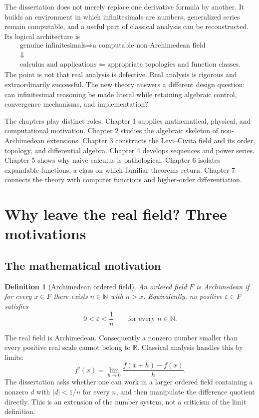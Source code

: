 \documentclass[11pt,a4paper]{article}
\newtheorem{definition}{Definition}[section]
\theoremstyle{remark}
\newcommand{\R}{\mathbb R}
\begin{document}
The dissertation does not merely replace one derivative formula by another. It builds an
environment in which infinitesimals are numbers, generalized series remain computable, and a
useful part of classical analysis can be reconstructed. Its logical architecture is
\[
\begin{gathered}
\boxed{\text{genuine infinitesimals}}
\Longrightarrow
\boxed{\text{a computable non-Archimedean field}}\\[0.4em]
\Downarrow\\[-0.1em]
\boxed{\text{calculus and applications}}
\Longleftarrow
\boxed{\text{appropriate topologies and function classes}}.
\end{gathered}
\]
The point is not that real analysis is defective. Real analysis is rigorous and extraordinarily
successful. The new theory answers a different design question: can infinitesimal reasoning be
made literal while retaining algebraic control, convergence mechanisms, and implementation?

The chapters play distinct roles. Chapter 1 supplies mathematical, physical, and computational
motivation. Chapter 2 studies the algebraic skeleton of non-Archimedean extensions. Chapter 3
constructs the Levi--Civita field and its order, topology, and differential algebra. Chapter 4
develops sequences and power series. Chapter 5 shows why naive calculus is pathological.
Chapter 6 isolates expandable functions, a class on which familiar theorems return. Chapter 7
connects the theory with computer functions and higher-order differentiation.

\section{Why leave the real field? Three motivations}

\subsection{The mathematical motivation}

\begin{definition}[Archimedean ordered field]
An ordered field $F$ is Archimedean if for every $x\in F$ there exists $n\in\mathbb N$ with
$n>x$. Equivalently, no positive $\varepsilon\in F$ satisfies
\[
0<\varepsilon<\frac1n\qquad\text{for every }n\in\mathbb N.
\]
\end{definition}

The real field is Archimedean. Consequently a nonzero number smaller than every positive real
scale cannot belong to $\R$. Classical analysis handles this by limits:
\[
f'(x)=\lim_{h\to0}\frac{f(x+h)-f(x)}{h}.
\]
The dissertation asks whether one can work in a larger ordered field containing a nonzero $d$
with $|d|<1/n$ for every $n$, and then manipulate the difference quotient directly. This is an
extension of the number system, not a criticism of the limit definition.
\end{document}
